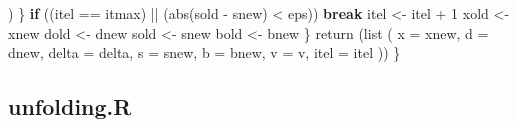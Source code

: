 \documentclass[
  12pt,
  letterpaper,
  DIV=11,
  numbers=noendperiod]{scrreprt}
\newenvironment{Shaded}{\begin{snugshade}}{\end{snugshade}}
\newcommand{\AttributeTok}[1]{\textcolor[rgb]{0.40,0.45,0.13}{#1}}
\newcommand{\ControlFlowTok}[1]{\textcolor[rgb]{0.00,0.23,0.31}{\textbf{#1}}}
\newcommand{\DecValTok}[1]{\textcolor[rgb]{0.68,0.00,0.00}{#1}}
\newcommand{\FunctionTok}[1]{\textcolor[rgb]{0.28,0.35,0.67}{#1}}
\newcommand{\NormalTok}[1]{\textcolor[rgb]{0.00,0.23,0.31}{#1}}
\newcommand{\OtherTok}[1]{\textcolor[rgb]{0.00,0.23,0.31}{#1}}
\newcommand{\SpecialCharTok}[1]{\textcolor[rgb]{0.37,0.37,0.37}{#1}}
\theoremstyle{remark}
\begin{document}
\begin{Shaded}
\begin{Highlighting}[]
\NormalTok{        )}
\NormalTok{      \}}
      \ControlFlowTok{if}\NormalTok{ ((itel }\SpecialCharTok{==}\NormalTok{ itmax) }\SpecialCharTok{||}\NormalTok{ (}\FunctionTok{abs}\NormalTok{(sold }\SpecialCharTok{{-}}\NormalTok{ snew) }\SpecialCharTok{\textless{}}\NormalTok{ eps))}
        \ControlFlowTok{break}
\NormalTok{      itel }\OtherTok{\textless{}{-}}\NormalTok{ itel }\SpecialCharTok{+} \DecValTok{1}
\NormalTok{      xold }\OtherTok{\textless{}{-}}\NormalTok{ xnew}
\NormalTok{      dold }\OtherTok{\textless{}{-}}\NormalTok{ dnew}
\NormalTok{      sold }\OtherTok{\textless{}{-}}\NormalTok{ snew}
\NormalTok{      bold }\OtherTok{\textless{}{-}}\NormalTok{ bnew}
\NormalTok{    \}}
    \FunctionTok{return}\NormalTok{ (}\FunctionTok{list}\NormalTok{ (}
      \AttributeTok{x =}\NormalTok{ xnew,}
      \AttributeTok{d =}\NormalTok{ dnew,}
      \AttributeTok{delta =}\NormalTok{ delta,}
      \AttributeTok{s =}\NormalTok{ snew,}
      \AttributeTok{b =}\NormalTok{ bnew,}
      \AttributeTok{v =}\NormalTok{ v,}
      \AttributeTok{itel =}\NormalTok{ itel}
\NormalTok{    ))}
\NormalTok{  \}}
\end{Highlighting}
\end{Shaded}

\subsection*{unfolding.R}\label{apcodeunfold}
\end{document}
